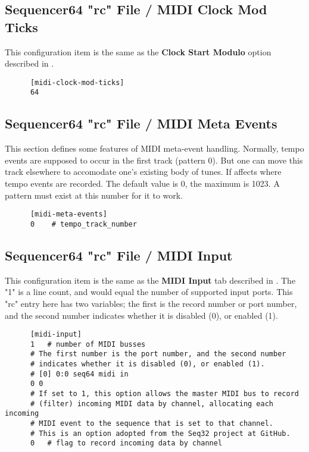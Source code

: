\subsection{Sequencer64 "rc" File / MIDI Clock Mod Ticks}
\label{subsec:seq64_rc_file_midi_cmt}

   This configuration item is the same as the
   \textbf{Clock Start Modulo} option described in
   .

   \begin{verbatim}
      [midi-clock-mod-ticks]
      64
   \end{verbatim}

\subsection{Sequencer64 "rc" File / MIDI Meta Events}
\label{subsec:seq64_rc_file_midi_meta}

   This section defines some features of MIDI meta-event handling.  Normally,
   tempo events are supposed to occur in the first track (pattern 0).  But one
   can move this track elsewhere to accomodate one's existing body of tunes.
   If affects where tempo events are recorded.  The default value is 0, the
   maximum is 1023.  A pattern must exist at this number for it to work.

   \begin{verbatim}
      [midi-meta-events]
      0    # tempo_track_number
   \end{verbatim}

\subsection{Sequencer64 "rc" File / MIDI Input}
\label{subsec:seq64_rc_file_midi_input}

   This configuration item is the same as the 
   \textbf{MIDI Input} tab described in
   .
   The "1" is a line count, and would equal the number of
   supported input ports.
   This "rc" entry here has two variables; the first is the record number or
   port number, and the second number indicates whether it is disabled (0),
   or enabled (1).

   \begin{verbatim}
      [midi-input]
      1   # number of MIDI busses
      # The first number is the port number, and the second number
      # indicates whether it is disabled (0), or enabled (1).
      # [0] 0:0 seq64 midi in
      0 0
      # If set to 1, this option allows the master MIDI bus to record
      # (filter) incoming MIDI data by channel, allocating each incoming
      # MIDI event to the sequence that is set to that channel.
      # This is an option adopted from the Seq32 project at GitHub.
      0   # flag to record incoming data by channel
   \end{verbatim}


